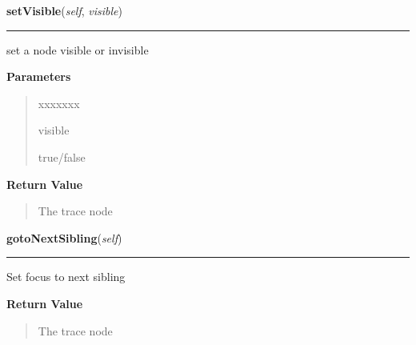\hspace{.8\funcindent}\begin{boxedminipage}{\funcwidth}

    \raggedright \textbf{setVisible}(\textit{self}, \textit{visible})

    \vspace{-1.5ex}

    \rule{\textwidth}{0.5\fboxrule}
\setlength{\parskip}{2ex}
    set a node visible or invisible

\setlength{\parskip}{1ex}
      \textbf{Parameters}
      \vspace{-1ex}

      \begin{quote}
        \begin{Ventry}{xxxxxxx}

          \item[visible]

          true/false

        \end{Ventry}

      \end{quote}

      \textbf{Return Value}
    \vspace{-1ex}

      \begin{quote}
      The trace node

      \end{quote}

    \end{boxedminipage}

    \label{tracetool:TraceNode:gotoNextSibling}

    \vspace{0.5ex}

\hspace{.8\funcindent}\begin{boxedminipage}{\funcwidth}

    \raggedright \textbf{gotoNextSibling}(\textit{self})

    \vspace{-1.5ex}

    \rule{\textwidth}{0.5\fboxrule}
\setlength{\parskip}{2ex}
    Set focus to next sibling

\setlength{\parskip}{1ex}
      \textbf{Return Value}
    \vspace{-1ex}

      \begin{quote}
      The trace node

      \end{quote}

    \end{boxedminipage}

